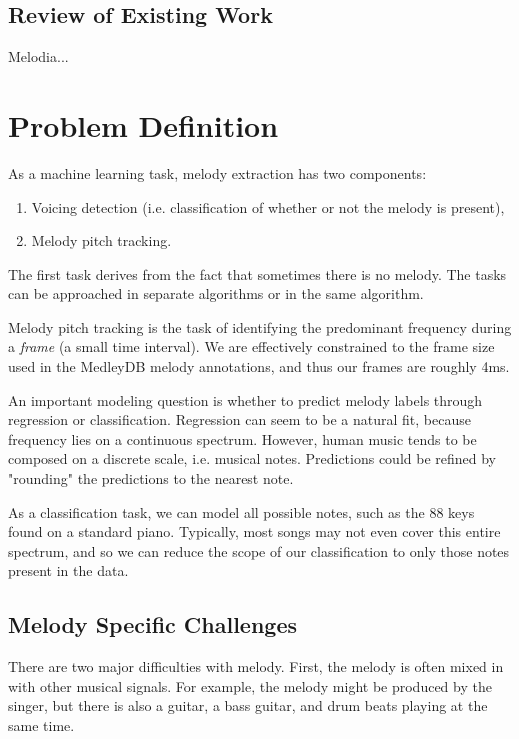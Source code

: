 \documentclass{article} %
\begin{document}
\subsection{Review of Existing Work}

Melodia...

\section{Problem Definition}
As a machine learning task, melody extraction has two components:

\begin{enumerate}
\item Voicing detection (i.e. classification of whether or not the melody is present),
\item Melody pitch tracking.
\end{enumerate}

The first task derives from the fact that sometimes there is no melody.  The tasks can be approached in separate algorithms or in the same algorithm.

Melody pitch tracking is the task of identifying the predominant frequency during a \textit{frame} (a small time interval).  We are effectively constrained to the frame size used in the MedleyDB melody annotations, and thus our frames are roughly 4ms.

An important modeling question is whether to predict melody labels through regression or classification.  Regression can seem to be a natural fit, because frequency lies on a continuous spectrum.  However, human music tends to be composed on a discrete scale, i.e. musical notes.  Predictions could be refined by "rounding" the predictions to the nearest note.

As a classification task, we can model all possible notes, such as the 88 keys found on a standard piano.  Typically, most songs may not even cover this entire spectrum, and so we can reduce the scope of our classification to only those notes present in the data.

\subsection{Melody Specific Challenges}

There are two major difficulties with melody.  First, the melody is often mixed in with other musical signals.  For example, the melody might be produced by the singer, but there is also a guitar, a bass guitar, and drum beats playing at the same time.  
\end{document}
